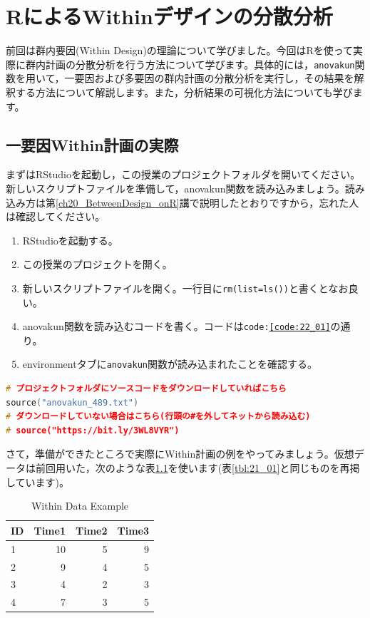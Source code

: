 \documentclass{ltjbook}
\begin{document}
\chapter{RによるWithinデザインの分散分析}
\label{withinDesign_onR}
前回は群内要因(Within Design)の理論について学びました。今回はRを使って実際に群内計画の分散分析を行う方法について学びます。具体的には，\texttt{anovakun}関数を用いて，一要因および多要因の群内計画の分散分析を実行し，その結果を解釈する方法について解説します。また，分析結果の可視化方法についても学びます。

\section{一要因Within計画の実際}

まずはRStudioを起動し，この授業のプロジェクトフォルダを開いてください。
新しいスクリプトファイルを準備して，anovakun関数を読み込みましょう。読み込み方は第\ref{ch20_BetweenDesign_onR}講で説明したとおりですから，忘れた人は確認してください。

\begin{enumerate}
    \item RStudioを起動する。
    \item この授業のプロジェクトを開く。
    \item 新しいスクリプトファイルを開く。一行目に\verb|rm(list=ls())|と書くとなお良い。
    \item anovakun関数を読み込むコードを書く。コードは\texttt{code:\ref{code:22_01}}の通り。
    \item environmentタブに\texttt{anovakun}関数が読み込まれたことを確認する。
\end{enumerate}

\begin{lstlisting}[language=c++,label={code:22_01},caption={ソースを読み込む}]
# プロジェクトフォルダにソースコードをダウンロードしていればこちら
source("anovakun_489.txt")
# ダウンロードしていない場合はこちら(行頭の#を外してネットから読み込む)
# source("https://bit.ly/3WL8VYR")
\end{lstlisting}

さて，準備ができたところで実際にWithin計画の例をやってみましょう。仮想データは前回用いた，次のような表\ref{tbl:22_01}を使います(表\ref{tbl:21_01}と同じものを再掲しています)。
\begin{table}[ht]
	\centering
	\caption{Within Data Example}
	\begin{tabular}{lrrr}
		\hline
		ID & Time1 & Time2 & Time3 \\
		\hline
		1  & 10    & 5     & 9     \\
		2  & 9     & 4     & 5     \\
		3  & 4     & 2     & 3     \\
		4  & 7     & 3     & 5     \\
		\hline
	\end{tabular}
	\label{tbl:22_01}
\end{table}
\end{document}
